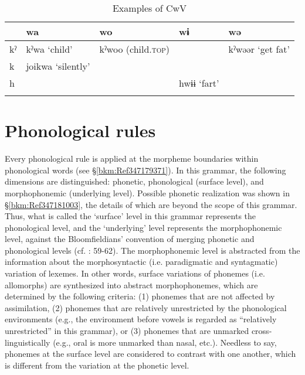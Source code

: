 \begin{table}
\caption{Examples of CwV}
\begin{tabularx}{\textwidth}{lllQl}
\lsptoprule
& {wa}    & {wo}   & {wɨ}   & {wə}  \\\midrule
{kˀ} & {kˀwa}  {‘child’} & {kˀwoo}  {(child.\textsc{top})}  &    & {kˀwəər}  {‘get fat’}\\
{k} & {joikwa}  {‘silently’}            \\
{h}  &                       &                        & {hwɨɨ}  {‘fart’}    \\
\lspbottomrule
\end{tabularx}
\end{table}

\section{Phonological rules}
\hypertarget{RefHeadingToc395696977}{}\label{bkm:Ref302723494}
Every phonological rule is applied at the morpheme boundaries within phonological words (see §\ref{bkm:Ref347179371}). In this grammar, the following dimensions are distinguished: phonetic, phonological (surface level), and morphophonemic (underlying level). Possible phonetic realization was shown in §\ref{bkm:Ref347181003}, the details of which are beyond the scope of this grammar. Thus, what is called the ‘surface’ level in this grammar represents the phonological level, and the ‘underlying’ level represents the morphophonemic level, against the Bloomfieldians’ convention of merging phonetic and phonological levels (cf. \citealt{Lass1984}: 59-62). The morphophonemic level is abstracted from the information about the morphosyntactic (i.e. paradigmatic and syntagmatic) variation of lexemes. In other words, surface variations of phonemes (i.e. allomorphs) are synthesized into abstract morphophonemes, which are determined by the following criteria: (1) phonemes that are not affected by assimilation, (2) phonemes that are relatively unrestricted by the phonological environments (e.g., the environment before vowels is regarded as “relatively unrestricted” in this grammar), or (3) phonemes that are unmarked cross-linguistically (e.g., oral is more unmarked than nasal, etc.). Needless to say, phonemes at the surface level are considered to contrast with one another, which is different from the variation at the phonetic level.

